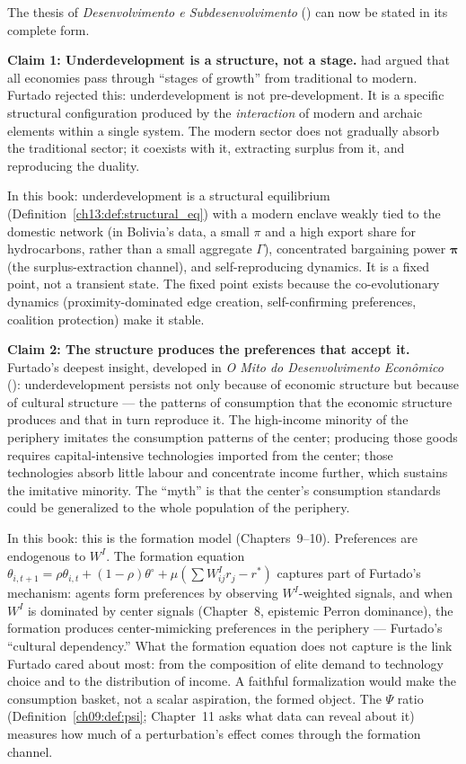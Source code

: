\documentclass[../structural_economics_book.tex]{subfiles}
\begin{document}
The thesis of \textit{Desenvolvimento e Subdesenvolvimento} (\citeyear{furtado1961desenvolvimento}) can now be stated in its complete form.

\textbf{Claim 1: Underdevelopment is a structure, not a stage.} \citet{rostow1960stages} had argued that all economies pass through ``stages of growth'' from traditional to modern. Furtado rejected this: underdevelopment is not pre-development. It is a specific structural configuration produced by the \textit{interaction} of modern and archaic elements within a single system. The modern sector does not gradually absorb the traditional sector; it coexists with it, extracting surplus from it, and reproducing the duality.

In this book: underdevelopment is a structural equilibrium (Definition~\ref{ch13:def:structural_eq}) with a modern enclave weakly tied to the domestic network (in Bolivia's data, a small $\pi$ and a high export share for hydrocarbons, rather than a small aggregate $\Gamma$), concentrated bargaining power $\boldsymbol{\pi}$ (the surplus-extraction channel), and self-reproducing dynamics. It is a fixed point, not a transient state. The fixed point exists because the co-evolutionary dynamics (proximity-dominated edge creation, self-confirming preferences, coalition protection) make it stable.

\textbf{Claim 2: The structure produces the preferences that accept it.} Furtado's deepest insight, developed in \textit{O Mito do Desenvolvimento Econ\^{o}mico} (\citeyear{furtado1974mito}): underdevelopment persists not only because of economic structure but because of cultural structure --- the patterns of consumption that the economic structure produces and that in turn reproduce it. The high-income minority of the periphery imitates the consumption patterns of the center; producing those goods requires capital-intensive technologies imported from the center; those technologies absorb little labour and concentrate income further, which sustains the imitative minority. The ``myth'' is that the center's consumption standards could be generalized to the whole population of the periphery.

In this book: this is the formation model (Chapters~9--10). Preferences are endogenous to $W^I$. The formation equation $\theta_{i,t+1} = \rho\theta_{i,t} + (1-\rho)\theta^{\circ} + \mu(\sum W^I_{ij}r_j - r^*)$ captures part of Furtado's mechanism: agents form preferences by observing $W^I$-weighted signals, and when $W^I$ is dominated by center signals (Chapter~8, epistemic Perron dominance), the formation produces center-mimicking preferences in the periphery --- Furtado's ``cultural dependency.'' What the formation equation does not capture is the link Furtado cared about most: from the composition of elite demand to technology choice and to the distribution of income. A faithful formalization would make the consumption basket, not a scalar aspiration, the formed object. The $\Psi$ ratio (Definition~\ref{ch09:def:psi}; Chapter~11 asks what data can reveal about it) measures how much of a perturbation's effect comes through the formation channel.
\end{document}
